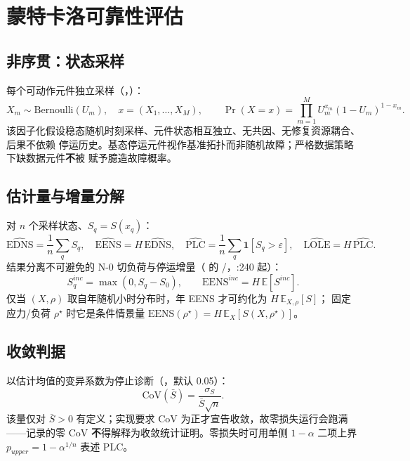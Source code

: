 \section{蒙特卡洛可靠性评估}\label{sec:rel-mc}

\subsection{非序贯：状态采样}
每个可动作元件独立采样（，）：
\begin{equation}
X_m\sim\mathrm{Bernoulli}(U_m),\quad x=(X_1,\dots,X_M),\qquad
\Pr(X=x)=\prod_{m=1}^M U_m^{x_m}(1-U_m)^{1-x_m}.
\end{equation}
该因子化假设稳态随机时刻采样、元件状态相互独立、无共因、无修复资源耦合、后果不依赖
停运历史。基态停运元件视作基准拓扑而非随机故障；严格数据策略下缺数据元件\textbf{不}被
赋予臆造故障概率。

\subsection{估计量与增量分解}
对 $n$ 个采样状态、$S_q=S(x_q)$：
\begin{equation}
\widehat{\mathrm{EDNS}}=\frac1n\sum_q S_q,\quad
\widehat{\mathrm{EENS}}=H\,\widehat{\mathrm{EDNS}},\quad
\widehat{\mathrm{PLC}}=\frac1n\sum_q\mathbf 1[S_q>\varepsilon],\quad
\widehat{\mathrm{LOLE}}=H\,\widehat{\mathrm{PLC}}.
\end{equation}
结果分离不可避免的 N-0 切负荷与停运增量（ 的
/，:240 起）：
\begin{equation}
S_q^{inc}=\max(0,S_q-S_0),\qquad \mathrm{EENS}^{inc}=H\,\mathbb E[S^{inc}].
\end{equation}
仅当 $(X,\rho)$ 取自年随机小时分布时，年 EENS 才可约化为 $H\,\mathbb E_{X,\rho}[S]$；
固定应力/负荷 $\rho^\star$ 时它是条件情景量 $\mathrm{EENS}(\rho^\star)=H\,\mathbb E_X[S(X,\rho^\star)]$。

\subsection{收敛判据}
以估计均值的变异系数为停止诊断（，默认 0.05）：
\begin{equation}
\mathrm{CoV}(\bar S)=\frac{\sigma_S}{\bar S\sqrt n}.
\end{equation}
该量仅对 $\bar S>0$ 有定义；实现要求 CoV 为正才宣告收敛，故零损失运行会跑满
——记录的零 CoV \textbf{不}得解释为收敛统计证明。零损失时可用单侧
$1-\alpha$ 二项上界 $p_{upper}=1-\alpha^{1/n}$ 表述 PLC。

